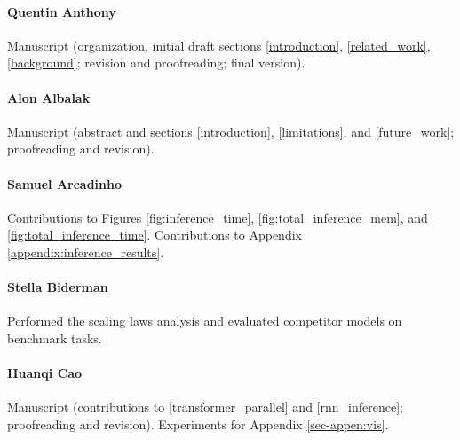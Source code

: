 \documentclass[11pt]{article}
\begin{document}
\paragraph{Quentin Anthony}  Manuscript (organization, initial draft sections \ref{introduction}, \ref{related_work}, \ref{background}; revision and proofreading; final version). 

\paragraph{Alon Albalak} Manuscript (abstract and sections \ref{introduction}, \ref{limitations}, and \ref{future_work}; proofreading and revision). 

\paragraph{Samuel Arcadinho} Contributions to Figures \ref{fig:inference_time}, \ref{fig:total_inference_mem}, and \ref{fig:total_inference_time}. Contributions to Appendix \ref{appendix:inference_results}.

\paragraph{Stella Biderman} Performed the scaling laws analysis and evaluated competitor models on benchmark tasks.

\paragraph{Huanqi Cao} Manuscript (contributions to \ref{transformer_parallel} and \ref{rnn_inference}; proofreading and revision). Experiments for Appendix \ref{sec-appen:vis}.
\end{document}

